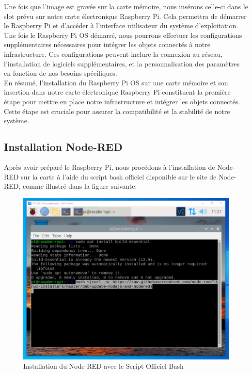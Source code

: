 Une fois que l'image est gravée sur la carte mémoire, nous insérons celle-ci dans le slot prévu sur notre carte électronique Raspberry Pi. Cela permettra de démarrer le Raspberry Pi et d'accéder à l'interface utilisateur du système d'exploitation. \\

Une fois le Raspberry Pi OS démarré, nous pourrons effectuer les configurations supplémentaires nécessaires pour intégrer les objets connectés à notre infrastructure. Ces configurations peuvent inclure la connexion au réseau, l'installation de logiciels supplémentaires, et la personnalisation des paramètres en fonction de nos besoins spécifiques. \\

En résumé, l'installation du Raspberry Pi OS sur une carte mémoire et son insertion dans notre carte électronique Raspberry Pi constituent la première étape pour mettre en place notre infrastructure et intégrer les objets connectés. Cette étape est cruciale pour assurer la compatibilité et la stabilité de notre système. \\



\subsection{Installation Node-RED}


Après avoir préparé le Raspberry Pi, nous procédons à l'installation de Node-RED sur la carte à l'aide du script bash officiel disponible sur le site de Node-RED, comme illustré dans la figure suivante. \\



\begin{figure}[H]
 \centering
    \includegraphics[width=15cm]{Images/NodeRedInstall1.png}
    \caption{Installation du Node-RED avec le Script Officiel Bash}
    \label{Chap4.3.2}
\end{figure}    
\smallskip

